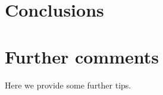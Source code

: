 \documentclass[letterpaper]{article}
\begin{document}

\section{Conclusions}


\section{Further comments}

Here we provide some further tips.
\end{document}
